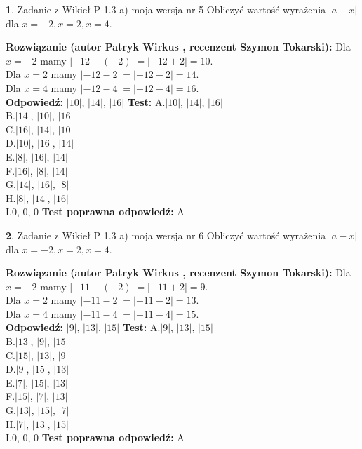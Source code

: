 \documentclass[12pt, a4paper]{article}
\theoremstyle{definition} %
\newtheorem{zad}{}
\newcommand{\zadStart}[1]{\begin{zad}#1\newline}
\newcommand{\zadStop}{\end{zad}}
\newcommand{\rozwStart}[2]{\noindent \textbf{Rozwiązanie (autor #1 , recenzent #2): }\newline}
\newcommand{\rozwStop}{\newline}
\newcommand{\odpStart}{\noindent \textbf{Odpowiedź:}\newline}
\newcommand{\odpStop}{\newline}
\newcommand{\testStart}{\noindent \textbf{Test:}\newline}
\newcommand{\testStop}{\newline}
\newcommand{\kluczStart}{\noindent \textbf{Test poprawna odpowiedź:}\newline}
\newcommand{\kluczStop}{\newline}
\begin{document}
\zadStart{Zadanie z Wikieł P 1.3 a) moja wersja nr 5}
Obliczyć wartość wyrażenia $|a - x|$ dla $x=-2,x=2,x=4$.
\zadStop
\rozwStart{Patryk Wirkus}{Szymon Tokarski}
Dla $x = -2$ mamy $|-12 - (-2)| = |-12 + 2| = 10$.\\
Dla $x = 2$ mamy $|-12 - 2| = |-12 - 2| = 14$.\\
Dla $x = 4$ mamy $|-12 - 4| = |-12 - 4| = 16$.\\
\rozwStop
\odpStart
$|10|$, $|14|$, $|16|$
\odpStop
\testStart
A.$|10|$, $|14|$, $|16|$\\
B.$|14|$, $|10|$, $|16|$\\
C.$|16|$, $|14|$, $|10|$\\
D.$|10|$, $|16|$, $|14|$\\
E.$|8|$, $|16|$, $|14|$\\
F.$|16|$, $|8|$, $|14|$\\
G.$|14|$, $|16|$, $|8|$\\
H.$|8|$, $|14|$, $|16|$\\
I.$0$, $0$, $0$
\testStop
\kluczStart
A
\kluczStop



\zadStart{Zadanie z Wikieł P 1.3 a) moja wersja nr 6}
Obliczyć wartość wyrażenia $|a - x|$ dla $x=-2,x=2,x=4$.
\zadStop
\rozwStart{Patryk Wirkus}{Szymon Tokarski}
Dla $x = -2$ mamy $|-11 - (-2)| = |-11 + 2| = 9$.\\
Dla $x = 2$ mamy $|-11 - 2| = |-11 - 2| = 13$.\\
Dla $x = 4$ mamy $|-11 - 4| = |-11 - 4| = 15$.\\
\rozwStop
\odpStart
$|9|$, $|13|$, $|15|$
\odpStop
\testStart
A.$|9|$, $|13|$, $|15|$\\
B.$|13|$, $|9|$, $|15|$\\
C.$|15|$, $|13|$, $|9|$\\
D.$|9|$, $|15|$, $|13|$\\
E.$|7|$, $|15|$, $|13|$\\
F.$|15|$, $|7|$, $|13|$\\
G.$|13|$, $|15|$, $|7|$\\
H.$|7|$, $|13|$, $|15|$\\
I.$0$, $0$, $0$
\testStop
\kluczStart
A
\kluczStop
\end{document}
